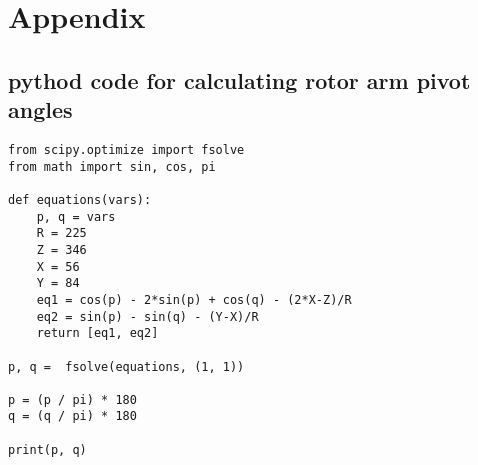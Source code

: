 \documentclass[11pt]{article}
\begin{document}
\section*{Appendix}
\subsection*{pythod code for calculating rotor arm pivot angles}

\begin{lstlisting}
from scipy.optimize import fsolve
from math import sin, cos, pi

def equations(vars):
    p, q = vars
    R = 225
    Z = 346
    X = 56
    Y = 84
    eq1 = cos(p) - 2*sin(p) + cos(q) - (2*X-Z)/R
    eq2 = sin(p) - sin(q) - (Y-X)/R
    return [eq1, eq2]

p, q =  fsolve(equations, (1, 1))

p = (p / pi) * 180
q = (q / pi) * 180

print(p, q)
\end{lstlisting}
\end{document}
